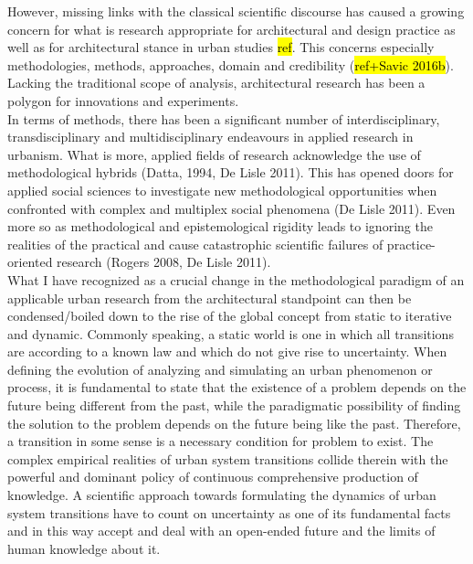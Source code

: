 \documentclass[11pt]{report}
\begin{document}
However, missing links with the classical scientific discourse has caused a growing concern for what is research appropriate for architectural and design practice as well as for architectural stance in urban studies \hl{ref}. This concerns especially methodologies, methods, approaches, domain and credibility (\hl{ref+Savic 2016b}). Lacking the traditional scope of analysis, architectural research has been a polygon for innovations and experiments.
\\
In terms of methods, there has been a significant number of interdisciplinary, transdisciplinary and multidisciplinary endeavours in applied research in urbanism. What is more, applied fields of research acknowledge the use of methodological hybrids (Datta, 1994, De Lisle 2011). This has opened doors for applied social sciences to investigate new methodological opportunities when confronted with complex and multiplex social phenomena (De Lisle 2011). Even more so as methodological and epistemological rigidity leads to ignoring the realities of the practical and cause catastrophic scientific failures of practice-oriented research (Rogers 2008, De Lisle 2011).
\\
What I have recognized as a crucial change in the methodological paradigm of an applicable urban research from the architectural standpoint can then be condensed/boiled down to the rise of the global concept from static to iterative and dynamic. Commonly speaking, a static world is one in which all transitions are according to a known law and which do not give rise to uncertainty. When defining the evolution of analyzing and simulating an urban phenomenon or process, it is fundamental to state that the existence of a problem depends on the future being different from the past, while the paradigmatic possibility of finding the solution to the problem depends on the future being like the past. Therefore, a transition in some sense is a necessary condition for problem to exist. The complex empirical realities of urban system transitions collide therein with the powerful and dominant policy of continuous comprehensive production of knowledge. A scientific approach towards formulating the dynamics of urban system transitions have to count on uncertainty as one of its fundamental facts and in this way accept and deal with an open-ended future and the limits of human knowledge about it.
\\
\end{document}
